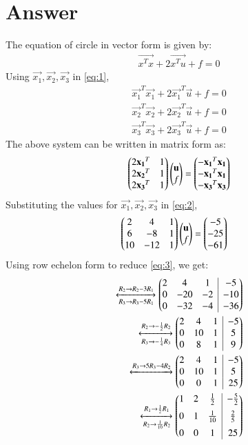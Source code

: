 \documentclass[journal,12pt,twocolumn]{IEEEtran}
\begin{document}
\section{Answer}
The equation of circle in vector form is given by:
\begin{align}
\vec{x^Tx}+2\vec{x^Tu}+f = 0 \label{eq:1}
\end{align}
Using $\vec{x_1}, \vec{x_2}, \vec{x_3}$ in \eqref{eq:1},
\begin{align}
\vec{x_1}^T\vec{x_1}+2\vec{x_1}^T\vec{u}+f=0\\
\vec{x_2}^T\vec{x_2}+2\vec{x_2}^T\vec{u}+f=0\\
\vec{x_3}^T\vec{x_3}+2\vec{x_3}^T\vec{u}+f=0
\end{align}
The above system can be written in matrix form as:
\begin{align}
\begin{pmatrix}2\mathbf{x_1}^T & 1\\2\mathbf{x_2}^T & 1\\2\mathbf{x_3}^T & 1\end{pmatrix}\begin{pmatrix}\mathbf{u}\\f\end{pmatrix}=\begin{pmatrix}-\mathbf{x_1}^T\mathbf{x_1}\\-\mathbf{x_1}^T\mathbf{x_1}\\-\mathbf{x_3}^T\mathbf{x_3}\end{pmatrix} \label{eq:2}
\end{align}
Substituting the values for $\vec{x_1}, \vec{x_2}, \vec{x_3}$ in \eqref{eq:2},
\begin{align}
\begin{pmatrix}2 & 4 & 1\\6 & -8 & 1\\10 & -12 & 1\end{pmatrix}\begin{pmatrix}\mathbf{u}\\f\end{pmatrix}&=\begin{pmatrix}-5\\-25\\-61\end{pmatrix} \label{eq:3}
\end{align}
Using row echelon form to reduce \eqref{eq:3}, we get:
\begin{align}
\xleftrightarrow[R_3\rightarrow R_3-5R_1]{R_2\rightarrow R_2-3R_1}\myvec{2 & 4 & 1 &\BAR & -5\\0 & -20 & -2 &\BAR & -10\\ 0 & -32 & -4 &\BAR & -36}\\
\xleftrightarrow[R_3\rightarrow -\frac{1}{4}R_3]{R_2 \rightarrow -\frac{1}{2}R_2}\myvec{2 & 4 & 1 &\BAR & -5\\0 & 10 & 1 &\BAR & 5\\ 0 & 8 & 1 &\BAR & 9}\\
\xleftrightarrow[]{R_3 \rightarrow 5R_3-4R_2}\myvec{2 & 4 & 1 &\BAR & -5\\0 & 10 & 1 &\BAR & 5\\ 0 & 0 & 1 &\BAR & 25}\\ \label{eq:4}
\xleftrightarrow[R_2 \rightarrow \frac{1}{10}R_2]{R_1 \rightarrow \frac{1}{2}R_1}\myvec{1 & 2 & \frac{1}{2} &\BAR & -\frac{5}{2}\\[0.2cm]0 & 1 & \frac{1}{10} &\BAR & \frac{2}{5}\\[0.2cm] 0 & 0 & 1 &\BAR & 25}
\end{align}
\end{document}
